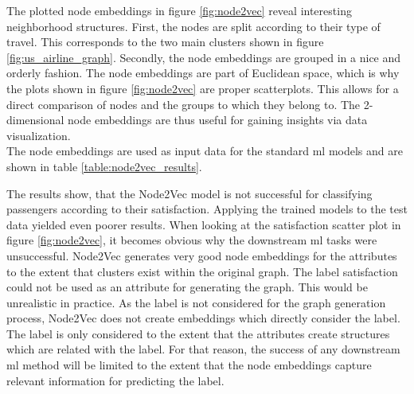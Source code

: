   \noindent The plotted node embeddings in figure \ref{fig:node2vec} reveal 
  interesting neighborhood structures. First, the nodes are split according to
  their type of travel. This corresponds to the two main clusters shown in
  figure \ref{fig:us_airline_graph}. Secondly, the node embeddings are grouped 
  in a nice and orderly fashion. The node embeddings are part of Euclidean
  space, which is why the plots shown in figure \ref{fig:node2vec} are proper
  scatterplots. This allows for a direct comparison of nodes and the groups to
  which they belong to. The 2-dimensional node embeddings are thus useful for
  gaining insights via data visualization.\\

  \noindent The node embeddings are used as input data for the standard \acs{ml} 
  models and are shown in table \ref{table:node2vec_results}.

  \begin{table}[h]
    \centering
    \caption{Node2Vec Classification Results}
    \label{table:node2vec_results}
  \end{table}

  \noindent The results show, that the Node2Vec model is not successful for
  classifying passengers according to their satisfaction. Applying the trained
  models to the test data yielded even poorer results. When looking at the
  satisfaction scatter plot in figure \ref{fig:node2vec}, it becomes obvious why
  the downstream \acs{ml} tasks were unsuccessful. Node2Vec generates very good 
  node embeddings for the attributes to the extent that clusters exist within 
  the original graph. The label satisfaction could not be used as an attribute 
  for generating the graph. This would be unrealistic in practice. As the label 
  is not considered for the graph generation process, Node2Vec does not create 
  embeddings which directly consider the label. The label is only considered to 
  the extent that the attributes create structures which are related with the 
  label. For that reason, the success of any downstream \acs{ml} method will be 
  limited to the extent that the node embeddings capture relevant information 
  for predicting the label. \\

